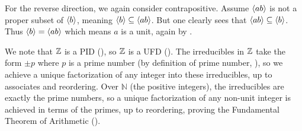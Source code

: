 \begin{questions}
    For the reverse direction, we again consider contrapositive. Assume $\left\langle ab\right\rangle$ is not a proper subset of $\left\langle b\right\rangle$, meaning $\left\langle b\right\rangle \subseteq \left\langle ab\right\rangle$. But one clearly sees that $\left\langle ab\right\rangle \subseteq \left\langle b\right\rangle$. Thus $\left\langle b\right\rangle = \left\langle ab\right\rangle$ which means $a$ is a unit, again by .

    \item We note that $\mathbb{Z}$ is a PID (), so $\mathbb{Z}$ is a UFD (). The irreducibles in $\mathbb{Z}$ take the form $\pm p$ where $p$ is a prime number (by definition of prime number, ), so we achieve a unique factorization of any integer into these irreducibles, up to associates and reordering. Over $\mathbb{N}$ (the positive integers), the irreducibles are exactly the prime numbers, so a unique factorization of any non-unit integer is achieved in terms of the primes, up to reordering, proving the Fundamental Theorem of Arithmetic ().
\end{questions}
